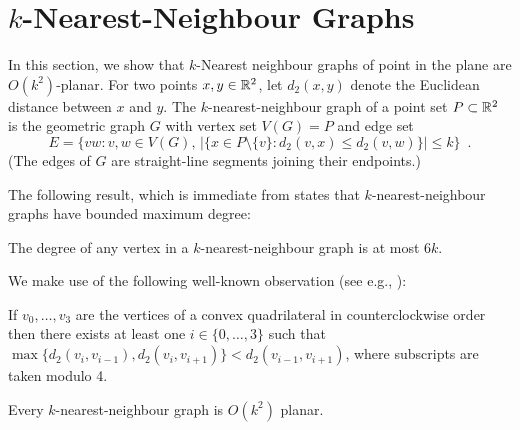 \documentclass{patmorin}
\begin{document}
\section{$k$-Nearest-Neighbour Graphs}

In this section, we show that $k$-Nearest neighbour graphs of point in the plane are $O(k^2)$-planar.  For two points $x,y\in\mathbb{R}^2$, let $d_2(x,y)$ denote the Euclidean distance between $x$ and $y$. The $k$-nearest-neighbour graph of a point set $P\subset\mathbb{R}^2$ is the geometric graph $G$ with vertex set $V(G)=P$ and edge set
\[  
  E= \{vw : v,w\in V(G),\, |\{x\in P\setminus\{v\}: d_2(v,x)\le d_2(v,w)\}|\le k\} \enspace .
\] 
(The edges of $G$ are straight-line segments joining their endpoints.)

The following result, which is immediate from \citet[Corollary~4.2.6]{abrego.munroy.ea:on} states that $k$-nearest-neighbour graphs have bounded maximum degree:
\begin{lem}
  The degree of any vertex in a $k$-nearest-neighbour graph is at most $6k$.
\end{lem}

We make use of the following well-known observation (see e.g., \citet[Lemma~2]{bose.morin.ea:routing}):
\begin{obs}
  If $v_0,\ldots,v_3$ are the vertices of a convex quadrilateral in counterclockwise order then there exists at least one $i\in\{0,\ldots,3\}$ such that $\max\{d_2(v_i,v_{i-1}), d_2(v_i,v_{i+1})\} < d_2(v_{i-1},v_{i+1})$, where subscripts are taken modulo 4.
\end{obs}

\begin{lem}
  Every $k$-nearest-neighbour graph is $O(k^2)$ planar.
\end{lem}
\end{document}
